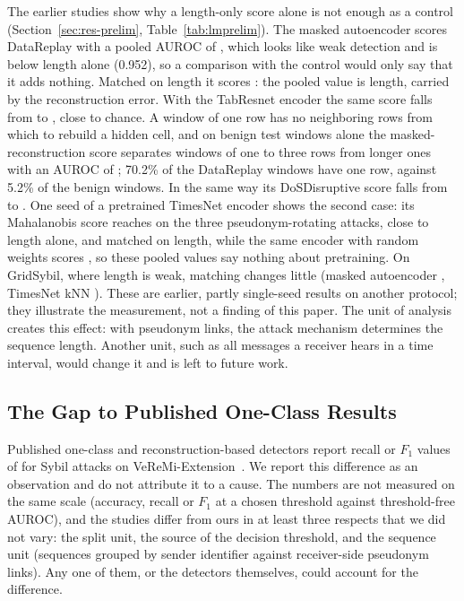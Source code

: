 The earlier studies show why a length-only score alone is not enough as a control
(Section~\ref{sec:res-prelim}, Table~\ref{tab:lmprelim}). The masked autoencoder scores DataReplay with a pooled
AUROC of , which looks like weak detection and is below length alone (0.952), so a
comparison with the control would only say that it adds nothing. Matched on length it scores : the pooled value is length, carried by the reconstruction error. With the TabResnet encoder the same
score falls from  to , close to chance. A window of one row has no neighboring
rows from which to rebuild a hidden cell, and on benign test windows alone the masked-reconstruction score
separates windows of one to three rows from longer ones with an AUROC of ; 70.2\% of the
DataReplay windows have one row, against 5.2\% of the benign windows. In the same way its DoSDisruptive score
falls from  to . One seed of a pretrained TimesNet encoder shows the second case: its
Mahalanobis score reaches  on the three pseudonym-rotating attacks, close to length alone,
and  matched on length, while the same encoder with random weights scores
, so these pooled values say nothing about pretraining. On GridSybil, where length is weak,
matching changes little (masked autoencoder , TimesNet kNN ).
These are earlier, partly single-seed results on another protocol; they illustrate the measurement, not a
finding of this paper. The unit of
analysis creates this effect: with pseudonym links, the attack mechanism determines the sequence length. Another
unit, such as all messages a receiver hears in a time interval, would change it and is left to future work.

\subsection{The Gap to Published One-Class Results}\label{sec:disc-gap}

Published one-class and reconstruction-based detectors report recall or $F_1$ values of
 for Sybil attacks on VeReMi-Extension~\cite{alladi2021deep,kalogiannis2026pampos,%
vishwanath2026federated}.  We report this difference as an observation and do not attribute it to a cause. The numbers are not
measured on the same scale (accuracy, recall or $F_1$ at a chosen threshold against threshold-free AUROC), and
the studies differ from ours in at least three respects that we did not vary: the split unit, the source of the
decision threshold, and the sequence unit (sequences grouped by sender identifier against receiver-side
pseudonym links). Any one of them, or the detectors themselves, could account for the difference.

